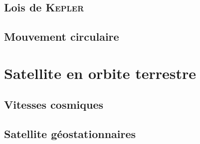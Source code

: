 \documentclass[../main/main.tex]{subfiles}
\begin{document}
\subsection{Lois de \textsc{Kepler}}
\subsection{Mouvement circulaire}

\section{Satellite en orbite terrestre}
\subsection{Vitesses cosmiques}
\subsection{Satellite géostationnaires}
\end{document}
